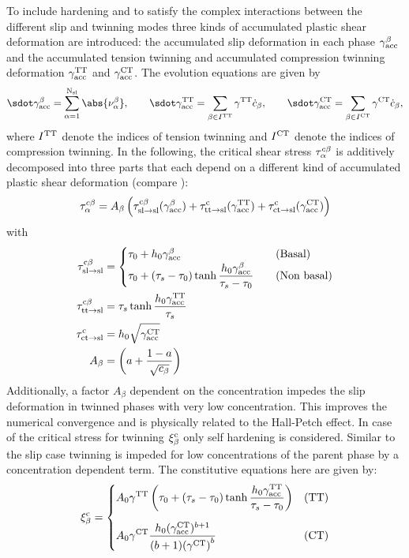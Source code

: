   To include hardening and to satisfy the complex interactions between the different slip and twinning modes three kinds of accumulated plastic shear deformation are introduced: the accumulated slip deformation in each phase $\gamma_{\rm acc}^{\beta}$ and the accumulated tension twinning and accumulated compression twinning deformation $\gamma_{\rm acc}^{\rm TT}$ and $\gamma_{\rm acc}^{\rm CT}$. The evolution equations are given by
  \begin{equation}
    \gammaaccbdot = \sumaI \abs{\nuab}, \qquad \gammaaccttdot = \sum_{\beta \in \Itt} \gammatt \cbdot, \qquad \gammaaccctdot = \sum_{\beta \in \Ict} \gammact \cbdot,
  \end{equation}
  where $I^{\rm TT}$ denote the indices of tension twinning and $I^{\rm CT}$ denote the indices of compression twinning. In the following, the critical shear stress $\tau_{\alpha}^{c\beta}$ is additively decomposed into three parts that each depend on a different kind of accumulated plastic shear deformation (compare ):
  \begin{equation}
    \tau_{\alpha}^{c\beta} = A_{\beta} \left( \tau^{\rm c\beta}_{\rm sl\rightarrow sl}(\gamma_{\rm acc}^{\beta}) + \tau^{\rm c}_{\rm tt\rightarrow sl}(\gamma_{\rm acc}^{\rm TT}) + \tau^{\rm c}_{\rm ct\rightarrow sl}(\gamma_{\rm acc}^{\rm CT}) \right)
    \label{eq:tauacb}
  \end{equation}
  with
  \begin{align}
    \tau^{\rm c\beta}_{\rm sl\rightarrow sl} &=
    \begin{cases}
        \tau_0 + {h}_{0} \gamma_{\rm acc}^{\beta} & \text{\quad (Basal)}  \\
        \displaystyle \tau_0 + (\tau_s-\tau_0) \tanh{\frac{{h}_{0}\gamma_{\rm acc}^{\beta}}{\tau_s-\tau_0}} & \text{\quad (Non basal)}
    \end{cases} \\
    \tau^{\rm c \beta}_{\rm tt\rightarrow sl} &= \tau_s \tanh{\frac{{h}_{0}\gamma_{\rm acc}^{\rm TT}}{\tau_s}} \label{eq:tauCttsl}\\
    \tau^{\rm c}_{\rm ct\rightarrow sl} &= {h}_{0} \sqrt{\gamma_{\rm acc}^{\rm CT}} \\
    A_{\beta} & =  \left( a + \frac{1-a}{\sqrt{c_{\beta}}} \right) \label{eq:Ab}
  \end{align}
  Additionally, a factor $A_\beta$ dependent on the concentration impedes the slip deformation in twinned phases with very low concentration. This improves the numerical convergence and is physically related to the Hall-Petch effect. In case of the critical stress for twinning $\xi_{\beta}^{\rm c}$ only self hardening is considered. Similar to the slip case twinning is impeded for low concentrations of the parent phase by a concentration dependent term. The constitutive equations here are given by:
  \begin{equation}
      \xi_{\beta}^{\rm c} = 
      \begin{cases}
          \displaystyle A_0 \gamma^{\rm TT} \left( \tau_0 + (\tau_s - \tau_0) \tanh{\frac{{h}_{0}\gamma_{\rm acc}^{\rm TT}}{\tau_s-\tau_0}} \right)& \text{(TT)}\\[15pt]
          \displaystyle A_0 \gamma^{\rm CT} \frac{{h}_{0} (\gamma_{\rm acc}^{\rm CT})^{b+1}}{(b+1){(\gamma^{\rm CT})}^b}  & \text{(CT)}
      \end{cases}
  \end{equation}

